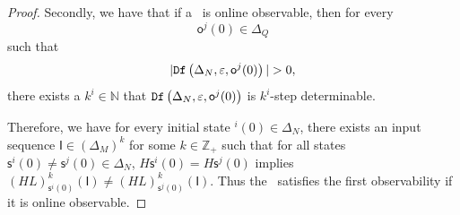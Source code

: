 \begin{proof}
Secondly, we have that if a \BCN\ is online observable,
then for every  \[\mathsf{o}^{j}(0)\in \Delta_Q\] such that \[|\Ded\left(\Delta_N,\varepsilon, \mathsf{o}^{j}(0)\right)|> 0,\] there exists a $k^{i}\in \mathbb{N}$ that ${\tt Df}\left(\Delta_N,\varepsilon,\mathsf{o}^{j}(0)\right)$ is $k^{i}$-step determinable. 

Therefore, we have for every initial state \State$^{i}(0)$$\in \Delta_N$, there exists an input sequence $\mathsf{I}\in(\Delta_M)^k$ for some $k\in \mathbb{Z}_+$ such that for all states $\mathsf{s}^{i}(0)\neq \mathsf{s}^{j}(0)\in \Delta_N$, $H\mathsf{s}^{i}(0)=H\mathsf{s}^{j}(0)$ implies $(HL)^k_{\mathsf{s}^{i}(0)}(\mathsf{I})\neq (HL)^k_{{\mathsf{s}^{j}(0)}}(\mathsf{I})$. Thus the \BCN\ satisfies the first observability if it is online observable.

\end{proof}

